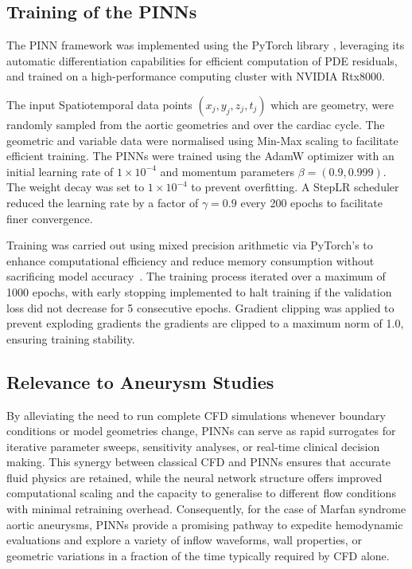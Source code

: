 \documentclass{article}
\begin{document}
\subsection{Training of the PINNs}

The PINN framework was implemented using the PyTorch library \citep{paszke2019pytorch}, leveraging its automatic differentiation capabilities for efficient computation of PDE residuals, and trained on a high-performance computing cluster with NVIDIA Rtx8000. 

The input Spatiotemporal data points $(x_j, y_j, z_j, t_j)$ which are geometry, were randomly sampled from the aortic geometries and over the cardiac cycle. The geometric and variable data were normalised using Min-Max scaling to facilitate efficient training. The PINNs were trained using the AdamW optimizer \citep{loshchilov2017decoupled} with an initial learning rate of $1 \times 10^{-4}$ and momentum parameters $\beta = (0.9, 0.999)$. The weight decay was set to $1 \times 10^{-4}$ to prevent overfitting. A StepLR scheduler reduced the learning rate by a factor of $\gamma = 0.9$ every 200 epochs to facilitate finer convergence.

Training was carried out using mixed precision arithmetic via PyTorch's to enhance computational efficiency and reduce memory consumption without sacrificing model accuracy~\cite{micikevicius2017mixed}. The training process iterated over a maximum of 1000 epochs, with early stopping implemented to halt training if the validation loss did not decrease for 5 consecutive epochs. Gradient clipping was applied to prevent exploding gradients the gradients are clipped to a maximum norm of 1.0, ensuring training stability.

\subsection{Relevance to Aneurysm Studies}
By alleviating the need to run complete CFD simulations whenever boundary conditions or model geometries change, PINNs can serve as rapid surrogates for iterative parameter sweeps, sensitivity analyses, or real-time clinical decision making. This synergy between classical CFD and PINNs ensures that accurate fluid physics are retained, while the neural network structure offers improved computational scaling and the capacity to generalise to different flow conditions with minimal retraining overhead. Consequently, for the case of Marfan syndrome aortic aneurysms, PINNs provide a promising pathway to expedite hemodynamic evaluations and explore a variety of inflow waveforms, wall properties, or geometric variations in a fraction of the time typically required by CFD alone.
\end{document}
